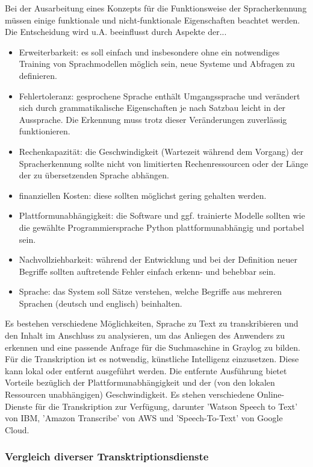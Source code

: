 Bei der Ausarbeitung eines Konzepts für die Funktionsweise der Spracherkennung müssen einige funktionale und nicht-funktionale Eigenschaften beachtet werden. Die Entscheidung wird u.A. beeinflusst durch Aspekte der... 

\begin{itemize}
\item Erweiterbarkeit: es soll einfach und insbesondere ohne ein notwendiges Training von Sprachmodellen möglich sein, neue Systeme und Abfragen zu definieren.
\item Fehlertoleranz: gesprochene Sprache enthält Umgangssprache und verändert sich durch grammatikalische Eigenschaften je nach Satzbau leicht in der Aussprache. Die Erkennung muss trotz dieser Veränderungen zuverlässig funktionieren.
\item Rechenkapazität: die Geschwindigkeit (Wartezeit während dem Vorgang) der Spracherkennung sollte nicht von limitierten Rechenressourcen oder der Länge der zu übersetzenden Sprache abhängen.
\item finanziellen Kosten: diese sollten möglichst gering gehalten werden.
\item Plattformunabhängigkeit: die Software und ggf. trainierte Modelle sollten wie die gewählte Programmiersprache Python plattformunabhängig und portabel sein.
\item Nachvollziehbarkeit: während der Entwicklung und bei der Definition neuer Begriffe sollten auftretende Fehler einfach erkenn- und behebbar sein.
\item Sprache: das System soll Sätze verstehen, welche Begriffe aus mehreren Sprachen (deutsch und englisch) beinhalten.
\end{itemize}

Es bestehen verschiedene Möglichkeiten, Sprache zu Text zu transkribieren und den Inhalt im Anschluss zu analysieren, um das Anliegen des Anwenders zu erkennen und eine passende Anfrage für die Suchmaschine in Graylog zu bilden. Für die Transkription ist es notwendig, künstliche Intelligenz einzusetzen. Diese kann lokal oder entfernt ausgeführt werden. Die entfernte Ausführung bietet Vorteile bezüglich der Plattformunabhängigkeit und der (von den lokalen Ressourcen unabhängigen) Geschwindigkeit. Es stehen verschiedene Online-Dienste für die Transkription zur Verfügung, darunter 'Watson Speech to Text' von IBM, 'Amazon Transcribe' von AWS und 'Speech-To-Text' von Google Cloud. 

\newpage

\subsubsection{Vergleich diverser Transktriptionsdienste}

